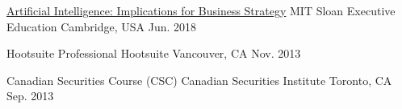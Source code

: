 



\begin{cvhonors}

	\cvhonor
	{\href{https://mitsloan.credential.getsmarter.com/tlwhd2mf}{Artificial Intelligence: Implications for Business Strategy}} %
	{MIT Sloan Executive Education} %
	{Cambridge, USA} %
	{Jun. 2018} %


	\cvhonor
	{Hootsuite Professional} %
	{Hootsuite} %
	{Vancouver, CA} %
	{Nov. 2013} %

	\cvhonor
	{Canadian Securities Course (CSC)} %
	{Canadian Securities Institute} %
	{Toronto, CA} %
	{Sep. 2013} %

\end{cvhonors}






